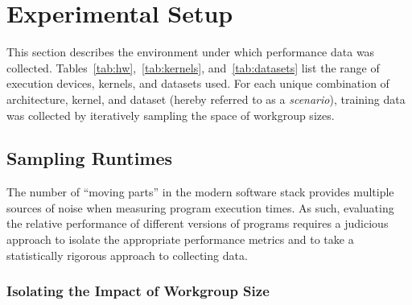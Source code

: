 \section{Experimental Setup}

This section describes the environment under which performance data
was collected. Tables~\ref{tab:hw},~\ref{tab:kernels},
and~\ref{tab:datasets} list the range of execution devices, kernels,
and datasets used. For each unique combination of architecture,
kernel, and dataset (hereby referred to as a \emph{scenario}),
training data was collected by iteratively sampling the space of
workgroup sizes.


\begin{table}

\caption{%
  Host machines.%
}
\label{tab:hosts}
\end{table}

\begin{table}

\caption{%
  OpenCL devices.%
}
\label{tab:hw}
\end{table}

\begin{table}

\caption{%
  Benchmark applications, border sizes, and static instruction counts.
  The ``simple'' and ``complex'' kernels are synthetic training
  programs. .%
}
\label{tab:kernels}
\end{table}

\begin{table}

\caption{%
  Datasets used.%
}
\label{tab:datasets}
\end{table}


\subsection{Sampling Runtimes}

The number of ``moving parts'' in the modern software stack provides
multiple sources of noise when measuring program execution times. As
such, evaluating the relative performance of different versions of
programs requires a judicious approach to isolate the appropriate
performance metrics and to take a statistically rigorous approach to
collecting data.


\subsubsection{Isolating the Impact of Workgroup Size}

